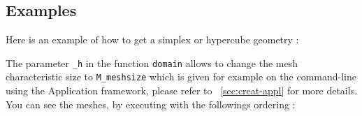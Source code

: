 


%


\subsection{Examples}
\label{mesh:examples}
Here is an example of how to get a simplex or hypercube geometry :


The parameter \lstinline!_h! in the function \lstinline!domain! allows to change the mesh characteristic size to \lstinline!M_meshsize! which is given for example on the command-line using the Application framework, please refer to ~\ref{sec:creat-appl} for more details. You can see the meshes, by executing with the followings ordering :

